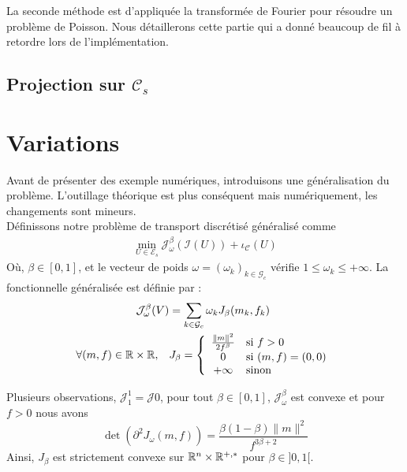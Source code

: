 \documentclass[a4paper,12pt]{article}
\begin{document}
La seconde méthode est d'appliquée la transformée de Fourier pour résoudre un problème de Poisson. Nous détaillerons cette partie qui a donné beaucoup de fil à retordre lors de l'implémentation. 

\subsection{Projection sur $\mathcal{C}_s$}


\section{Variations}
Avant de présenter des exemple numériques, introduisons une généralisation du problème. L'outillage théorique est plus conséquent mais numériquement, les changements sont mineurs. \\
Définissons notre problème de transport discrétisé généralisé comme
\begin{align}
\min_{U\in\mathcal{E}_s}\mathcal{J}_{\omega}^{\beta}(\mathcal{I}(U))+\iota_{\mathcal{C}}(U)
\end{align}
Où, $\beta\in[0,1]$, et le vecteur de poids $\omega=(\omega_k)_{k\in\mathcal{G}_c}$ vérifie $1\leq \omega_k\leq +\infty$. La fonctionnelle généralisée est définie par : 
\begin{align}
\mathcal{J}_{\omega}^{\beta}(V) &= \sum_{k\in\mathcal{G}_c} \omega_kJ_{\beta}(m_k,f_k)\\
\forall (m,f)\in\mathbb{R}\times\mathbb{R},\quad &J_{\beta}=\left\{ \begin{array}{cl}
\frac{\|m\|^2}{2f^{\beta}} & \text{si } f>0 \\
0 &\text{si } (m,f) = (0,0)\\
+\infty & \text{sinon} 
\end{array}\right.
\end{align}

Plusieurs observations, $\mathcal{J}_1^1=\mathcal{J0}$, pour tout $\beta\in [0,1]$, $\mathcal{J}_{\omega}^{\beta}$ est convexe et pour $f> 0$ nous avons 
$$
\det(\partial ^2J_{\omega}(m,f)) = \frac{\beta(1-\beta)\|m\|^2}{f^{3\beta+2}}
$$
Ainsi, $J_{\beta}$ est strictement convexe sur $\mathbb{R}^n\times\mathbb{R}^{+,*}$ pour $\beta \in]0,1[$. \\

\end{document}
